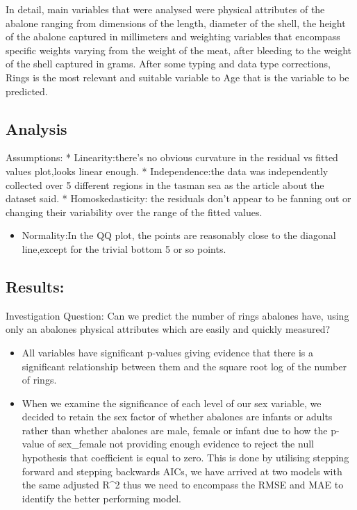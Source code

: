 \documentclass[letterpaper,9pt,twocolumn,twoside,]{pinp}
\providecommand{\tightlist}{%
  \setlength{\itemsep}{0pt}\setlength{\parskip}{0pt}}
\begin{document}
In detail, main variables that were analysed were physical attributes of
the abalone ranging from dimensions of the length, diameter of the
shell, the height of the abalone captured in millimeters and weighting
variables that encompass specific weights varying from the weight of the
meat, after bleeding to the weight of the shell captured in grams. After
some typing and data type corrections, Rings is the most relevant and
suitable variable to Age that is the variable to be predicted.

\subsection{Analysis}\label{analysis}

Assumptions: * Linearity:there's no obvious curvature in the residual vs
fitted values plot,looks linear enough. * Independence:the data was
independently collected over 5 different regions in the tasman sea as
the article about the dataset said. * Homoskedasticity: the residuals
don't appear to be fanning out or changing their variability over the
range of the fitted values.

\begin{itemize}
\tightlist
\item
  Normality:In the QQ plot, the points are reasonably close to the
  diagonal line,except for the trivial bottom 5 or so points.
\end{itemize}

\subsection{Results:}\label{results}

Investigation Question: Can we predict the number of rings abalones
have, using only an abalones physical attributes which are easily and
quickly measured?

\begin{itemize}
\tightlist
\item
  All variables have significant p-values giving evidence that there is
  a significant relationship between them and the square root log of the
  number of rings.
\item
  When we examine the significance of each level of our sex variable, we
  decided to retain the sex factor of whether abalones are infants or
  adults rather than whether abalones are male, female or infant due to
  how the p-value of sex\_female not providing enough evidence to reject
  the null hypothesis that coefficient is equal to zero. This is done by
  utilising stepping forward and stepping backwards AICs, we have
  arrived at two models with the same adjusted R\^{}2 thus we need to
  encompass the RMSE and MAE to identify the better performing model.
\end{itemize}
\end{document}
